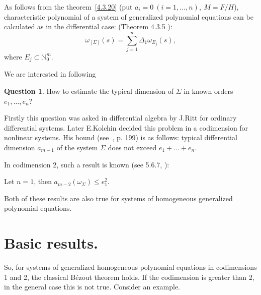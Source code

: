 \documentclass[a4paper,reqno,12pt]{amsart}
\theoremstyle{plain}
\theoremstyle{remark}
\theoremstyle{definition}
\newtheorem{question}{Question}
\renewcommand{\le}{\leqslant}
\newcommand{\N}{\mathbb{N}}
\begin{document}
As follows from the theorem~\ref{4.3.20} (put 
$a_i = 0\ (i = 1, \dots, n), \ M = F / H$),
characteristic polynomial of a system of generalized polynomial equations
can be calculated as in the differential case:
(Theorem 4.3.5 \cite {KLMP}):
\begin{equation}\label{eq1}
\omega_{[\Sigma]} (s) = \sum_ {j = 1}^n\Delta_1 \omega_ {E_j} (s),
\end{equation} 
where $E_j\subset \N_0^ m$.

We are interested in following  
\begin{question}\label{1}
How to estimate the typical dimension of $\Sigma $ in
known orders $e_1, \dots, e_n$?
\end{question}

Firstly this question was asked in differential algebra
by J.Ritt
for  ordinary differential systems. Later
E.Kolchin decided this problem in a codimension  for nonlinear
systems.
His bound (see~\cite {Kolchin}, p. 199) is as follows:
typical differential dimension $ a_ {m-1} $ of the system $\Sigma$
does not exceed
$e_1 + \dots + e_n$.
 
In codimension 2, such a result is known  
(see 5.6.7, \cite{KLMP}):

Let $n=1$, then
$a_{m-2}(\omega_{\Sigma})\le e_1^2$. 

Both of these results are also true for systems of homogeneous 
generalized polynomial equations.


\section{Basic results.}

So, for systems of generalized homogeneous polynomial equations
in codimensions 1 and 2, the classical B\'ezout theorem holds.
If the codimension is greater than 2, in the general case this is 
not true.    Consider an example.
\end{document}
